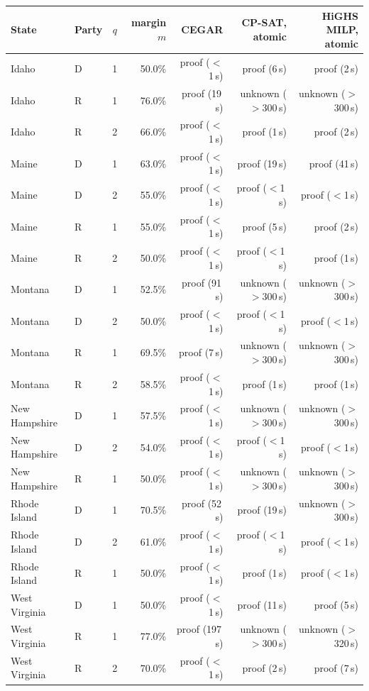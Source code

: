 \begin{tabular}{llcrrrr}
\toprule
State & Party & $q$ & margin $m$ & CEGAR & CP-SAT, atomic & HiGHS MILP, atomic \\
\midrule
Idaho & D & 1 & 50.0\% & proof ($<$1\,s) & proof (6\,s) & proof (2\,s) \\
Idaho & R & 1 & 76.0\% & proof (19\,s) & unknown ($>$300\,s) & unknown ($>$300\,s) \\
Idaho & R & 2 & 66.0\% & proof ($<$1\,s) & proof (1\,s) & proof (2\,s) \\
Maine & D & 1 & 63.0\% & proof ($<$1\,s) & proof (19\,s) & proof (41\,s) \\
Maine & D & 2 & 55.0\% & proof ($<$1\,s) & proof ($<$1\,s) & proof ($<$1\,s) \\
Maine & R & 1 & 55.0\% & proof ($<$1\,s) & proof (5\,s) & proof (2\,s) \\
Maine & R & 2 & 50.0\% & proof ($<$1\,s) & proof ($<$1\,s) & proof (1\,s) \\
Montana & D & 1 & 52.5\% & proof (91\,s) & unknown ($>$300\,s) & unknown ($>$300\,s) \\
Montana & D & 2 & 50.0\% & proof ($<$1\,s) & proof ($<$1\,s) & proof ($<$1\,s) \\
Montana & R & 1 & 69.5\% & proof (7\,s) & unknown ($>$300\,s) & unknown ($>$300\,s) \\
Montana & R & 2 & 58.5\% & proof ($<$1\,s) & proof (1\,s) & proof (1\,s) \\
New Hampshire & D & 1 & 57.5\% & proof ($<$1\,s) & unknown ($>$300\,s) & unknown ($>$300\,s) \\
New Hampshire & D & 2 & 54.0\% & proof ($<$1\,s) & proof ($<$1\,s) & proof ($<$1\,s) \\
New Hampshire & R & 1 & 50.0\% & proof ($<$1\,s) & unknown ($>$300\,s) & unknown ($>$300\,s) \\
Rhode Island & D & 1 & 70.5\% & proof (52\,s) & proof (19\,s) & unknown ($>$300\,s) \\
Rhode Island & D & 2 & 61.0\% & proof ($<$1\,s) & proof ($<$1\,s) & proof ($<$1\,s) \\
Rhode Island & R & 1 & 50.0\% & proof ($<$1\,s) & proof (1\,s) & proof ($<$1\,s) \\
West Virginia & D & 1 & 50.0\% & proof ($<$1\,s) & proof (11\,s) & proof (5\,s) \\
West Virginia & R & 1 & 77.0\% & proof (197\,s) & unknown ($>$300\,s) & unknown ($>$320\,s) \\
West Virginia & R & 2 & 70.0\% & proof ($<$1\,s) & proof (2\,s) & proof (7\,s) \\
\bottomrule
\end{tabular}
